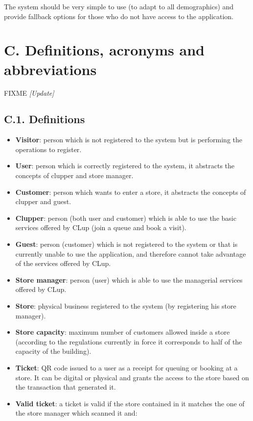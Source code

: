 The system should be very simple to use (to adapt to all demographics) and provide fallback options for those who do not have access to the application.

\section{C. Definitions, acronyms and abbreviations}
FIXME \emph{[Update]}

\subsection{C.1. Definitions}

\begin{itemize}
\item
  \textbf{Visitor}: person which is not registered to the system but is performing the operations to register.
\item
  \textbf{User}: person which is correctly registered to the system, it abstracts the concepts of clupper and store manager.
\item
  \textbf{Customer}: person which wants to enter a store, it abstracts the concepts of clupper and guest.
\item
  \textbf{Clupper}: person (both user and customer) which is able to use the basic services offered by CLup (join a queue and book a visit).
\item
  \textbf{Guest}: person (customer) which is not registered to the system or that is currently unable to use the application, and therefore cannot take advantage of the services offered by CLup.
\item
  \textbf{Store manager}: person (user) which is able to use the managerial services offered by CLup.
\item
  \textbf{Store}: physical business registered to the system (by registering his store manager).
\item
  \textbf{Store capacity}: maximum number of customers allowed inside a store (according to the regulations currently in force it corresponds to half of the capacity of the building).
\item
  \textbf{Ticket}: QR code issued to a user as a receipt for queuing or booking at a store. It can be digital or physical and grants the access to the store based on the transaction that generated it.
\item
  \textbf{Valid ticket}: a ticket is valid if the store contained in it matches the one of the store manager which scanned it and:

\end{itemize}
